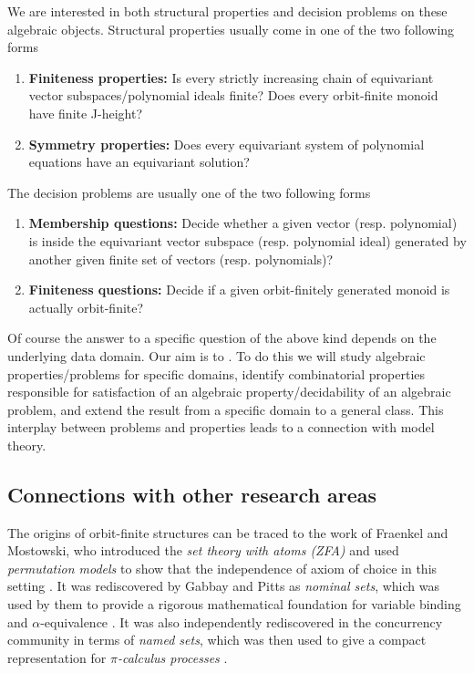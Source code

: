 \documentclass[a4paper,11pt]{article}
\begin{document}
We are interested in both structural properties and decision problems on these algebraic objects.
Structural properties usually come in one of the two following forms
%
\begin{enumerate}
\item \textbf{Finiteness properties:} Is every strictly increasing chain of equivariant vector subspaces/polynomial ideals finite? Does every orbit-finite monoid have finite J-height?
\item \textbf{Symmetry properties:} Does every equivariant system of polynomial equations have an equivariant solution? 
\end{enumerate}
%
The decision problems are usually one of the two following forms  
%
\begin{enumerate}
\item \textbf{Membership questions:} Decide whether a given vector (resp. polynomial) is inside the equivariant vector
subspace (resp. polynomial ideal) generated by another given finite set of vectors (resp. polynomials)?
\item \textbf{Finiteness questions:} Decide if a given orbit-finitely generated monoid is actually orbit-finite?
\end{enumerate}
%
Of course the answer to a specific question of the above kind depends on the underlying data domain.
Our aim is to .
To do this we will study algebraic properties/problems for specific domains,
identify combinatorial properties responsible for satisfaction of an algebraic property/decidability of an algebraic problem, and extend the result from a specific domain to a general class.
This interplay between problems and properties leads to a connection with model theory.
%
\subsection{Connections with other research areas}
%
The origins of orbit-finite structures can be traced to the work of Fraenkel and Mostowski,
who introduced the \emph{set theory with atoms (ZFA)} and used \emph{permutation models} to show that the independence of axiom of choice in this setting
\cite{jech}.
It was rediscovered by Gabbay and Pitts as \emph{nominal sets},
which was used by them to provide a rigorous mathematical foundation for variable binding and $\alpha$-equivalence \cite{GP99}.
It was also independently rediscovered in the concurrency community in terms of \emph{named sets},
which was then used to give a compact representation for \emph{$\pi$-calculus processes}
\cite{MP98}.
\end{document}
